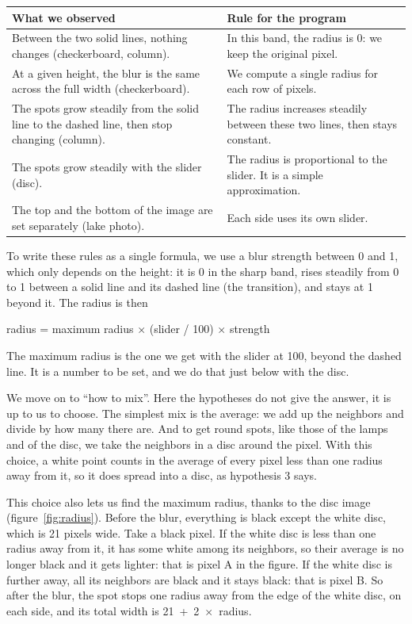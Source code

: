 \documentclass[10pt,a4paper]{article}
\begin{document}
{\small
\renewcommand{\arraystretch}{1.3}
\begin{center}
\begin{tabular}{>{\raggedright\arraybackslash}p{}>{\raggedright\arraybackslash}p{}}
\hline
What we observed & Rule for the program \\
\hline
Between the two solid lines, nothing changes (checkerboard, column). & In this band, the radius is 0: we keep the original pixel. \\
At a given height, the blur is the same across the full width (checkerboard). & We compute a single radius for each row of pixels. \\
The spots grow steadily from the solid line to the dashed line, then stop changing (column). & The radius increases steadily between these two lines, then stays constant. \\
The spots grow steadily with the slider (disc). & The radius is proportional to the slider. It is a simple approximation. \\
The top and the bottom of the image are set separately (lake photo). & Each side uses its own slider. \\
\hline
\end{tabular}
\end{center}
}

To write these rules as a single formula, we use a blur strength between 0 and 1, which only depends on the height: it is 0 in the sharp band, rises steadily from 0 to 1 between a solid line and its dashed line (the transition), and stays at 1 beyond it. The radius is then

\begin{center}
radius = maximum radius × (slider / 100) × strength
\end{center}

The maximum radius is the one we get with the slider at 100, beyond the dashed line. It is a number to be set, and we do that just below with the disc.

We move on to ``how to mix''. Here the hypotheses do not give the answer, it is up to us to choose. The simplest mix is the average: we add up the neighbors and divide by how many there are. And to get round spots, like those of the lamps and of the disc, we take the neighbors in a disc around the pixel. With this choice, a white point counts in the average of every pixel less than one radius away from it, so it does spread into a disc, as hypothesis 3 says.

This choice also lets us find the maximum radius, thanks to the disc image (figure~\ref{fig:radius}). Before the blur, everything is black except the white disc, which is 21 pixels wide. Take a black pixel. If the white disc is less than one radius away from it, it has some white among its neighbors, so their average is no longer black and it gets lighter: that is pixel A in the figure. If the white disc is further away, all its neighbors are black and it stays black: that is pixel B. So after the blur, the spot stops one radius away from the edge of the white disc, on each side, and its total width is \mbox{21 + 2 × radius}.
\end{document}
